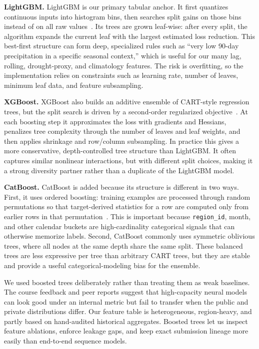 \documentclass[conference]{IEEEtran}
\begin{document}
\textbf{LightGBM.} LightGBM is our primary tabular anchor. It first quantizes
continuous inputs into histogram bins, then searches split gains on those bins
instead of on all raw values~\cite{ke2017lightgbm}. Its trees are grown
leaf-wise: after every split, the algorithm expands the current leaf with the
largest estimated loss reduction. This best-first structure can form deep,
specialized rules such as ``very low 90-day precipitation in a specific
seasonal context,'' which is useful for our many lag, rolling, drought-proxy,
and climatology features. The risk is overfitting, so the implementation relies
on constraints such as learning rate, number of leaves, minimum leaf data, and
feature subsampling.

\textbf{XGBoost.} XGBoost also builds an additive ensemble of CART-style
regression trees, but the split search is driven by a second-order regularized
objective~\cite{chen2016xgboost}. At each boosting step it approximates the
loss with gradients and Hessians, penalizes tree complexity through the number
of leaves and leaf weights, and then applies shrinkage and row/column
subsampling. In practice this gives a more conservative, depth-controlled tree
structure than LightGBM. It often captures similar nonlinear interactions, but
with different split choices, making it a strong diversity partner rather than
a duplicate of the LightGBM model.

\textbf{CatBoost.} CatBoost is added because its structure is different in two
ways. First, it uses ordered boosting: training examples are processed through
random permutations so that target-derived statistics for a row are computed
only from earlier rows in that permutation~\cite{prokhorenkova2018catboost}.
This is important because \texttt{region\_id}, month, and other calendar
buckets are high-cardinality categorical signals that can otherwise memorize
labels. Second, CatBoost commonly uses symmetric oblivious trees, where all
nodes at the same depth share the same split. These balanced trees are less
expressive per tree than arbitrary CART trees, but they are stable and provide
a useful categorical-modeling bias for the ensemble.

We used boosted trees deliberately rather than treating them as weak baselines.
The course feedback and peer reports suggest that high-capacity neural models
can look good under an internal metric but fail to transfer when the public and
private distributions differ. Our feature table is heterogeneous, region-heavy,
and partly based on hand-audited historical aggregates. Boosted trees let us
inspect feature ablations, enforce leakage gaps, and keep exact submission
lineage more easily than end-to-end sequence models.
\end{document}
